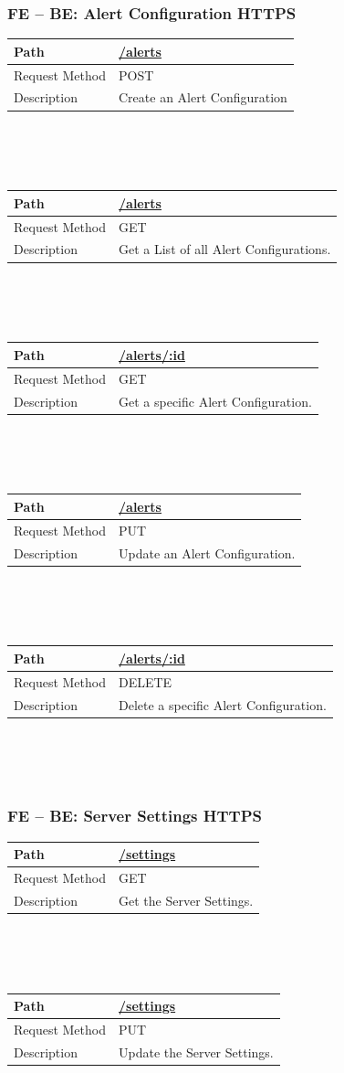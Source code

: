 \documentclass{scrreprt}
\begin{document}
\subsubsection{FE -- BE: Alert Configuration HTTPS}
\begin{tabularx}{12cm}{l|l}
	Path & \url{/alerts} \\\hline
	Request Method & POST \\\hline
	Description & Create an Alert Configuration
\end{tabularx}
\\
\\ \\
\begin{tabularx}{12cm}{l|l}
	Path & \url{/alerts} \\\hline
	Request Method & GET \\\hline
	Description & Get a List of all Alert Configurations.
\end{tabularx}
\\
\\ \\
\begin{tabularx}{12cm}{l|l}
	Path & \url{/alerts/:id} \\\hline
	Request Method & GET \\\hline
	Description & Get a specific Alert Configuration.
\end{tabularx}
\\
\\ \\
\begin{tabularx}{12cm}{l|l}
	Path & \url{/alerts} \\\hline
	Request Method & PUT \\\hline
	Description & Update an Alert Configuration.
\end{tabularx}
\\
\\ \\
\begin{tabularx}{12cm}{l|l}
	Path & \url{/alerts/:id} \\\hline
	Request Method & DELETE \\\hline
	Description & Delete a specific Alert Configuration.
\end{tabularx}
\\
\\ \\
\subsubsection{FE -- BE: Server Settings HTTPS}
\begin{tabularx}{12cm}{l|l}
	Path & \url{/settings} \\\hline
	Request Method & GET \\\hline
	Description & Get the Server Settings.
\end{tabularx}
\\
\\ \\
\begin{tabularx}{12cm}{l|l}
	Path & \url{/settings} \\\hline
	Request Method & PUT \\\hline
	Description & Update the Server Settings.
\end{tabularx}
\end{document}
